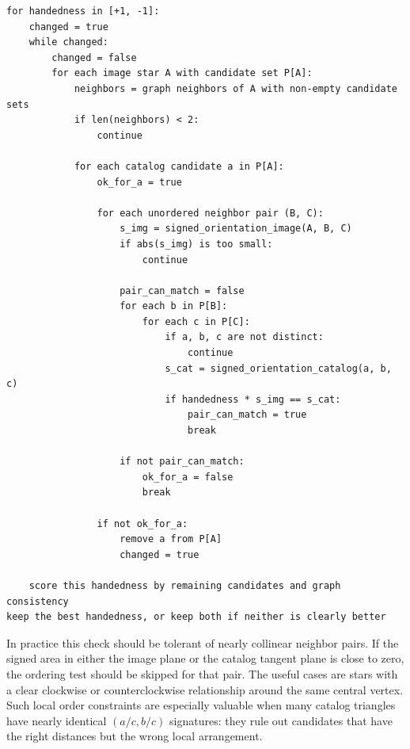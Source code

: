 \documentclass[11pt]{article}
\begin{document}
\begin{lstlisting}[language={},caption={Angular-order pruning for a partial asterism graph.}]
for handedness in [+1, -1]:
    changed = true
    while changed:
        changed = false
        for each image star A with candidate set P[A]:
            neighbors = graph neighbors of A with non-empty candidate sets
            if len(neighbors) < 2:
                continue

            for each catalog candidate a in P[A]:
                ok_for_a = true

                for each unordered neighbor pair (B, C):
                    s_img = signed_orientation_image(A, B, C)
                    if abs(s_img) is too small:
                        continue

                    pair_can_match = false
                    for each b in P[B]:
                        for each c in P[C]:
                            if a, b, c are not distinct:
                                continue
                            s_cat = signed_orientation_catalog(a, b, c)
                            if handedness * s_img == s_cat:
                                pair_can_match = true
                                break

                    if not pair_can_match:
                        ok_for_a = false
                        break

                if not ok_for_a:
                    remove a from P[A]
                    changed = true

    score this handedness by remaining candidates and graph consistency
keep the best handedness, or keep both if neither is clearly better
\end{lstlisting}

In practice this check should be tolerant of nearly collinear neighbor pairs.
If the signed area in either the image plane or the catalog tangent plane is
close to zero, the ordering test should be skipped for that pair. The useful
cases are stars with a clear clockwise or counterclockwise relationship around
the same central vertex. Such local order constraints are especially valuable
when many catalog triangles have nearly identical \((a/c,b/c)\) signatures:
they rule out candidates that have the right distances but the wrong local
arrangement.
\end{document}
